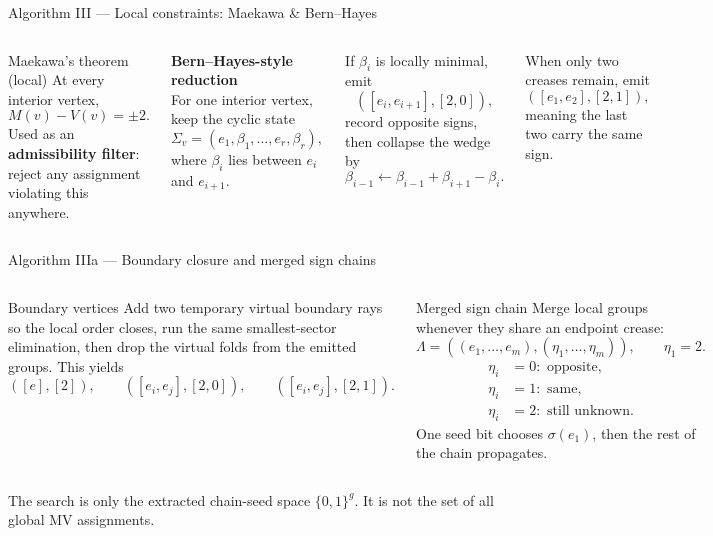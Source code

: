 \documentclass[aspectratio=169,10pt]{beamer}
\begin{document}
\begin{frame}{Algorithm III — Local constraints: Maekawa \& Bern--Hayes}
\begin{columns}[T,onlytextwidth]
\begin{block}{Maekawa's theorem (local) \cite{hull_math_flat}}
At every interior vertex,
\[
M(v)-V(v)=\pm 2.
\]
Used as an \textbf{admissibility filter}: reject any assignment violating
this anywhere.
\end{block}

\textbf{Bern--Hayes-style reduction \cite{bern_hayes}}\\[4pt]
\scriptsize For one interior vertex, keep the cyclic state
\[
\Sigma_v=(e_1,\beta_1,\dots,e_r,\beta_r),
\]
where \(\beta_i\) lies between \(e_i\) and \(e_{i+1}\).

\smallskip
\scriptsize If \(\beta_i\) is locally minimal, emit
\[
([e_i,e_{i+1}],[2,0]),
\]
\scriptsize record opposite signs, then collapse the wedge by
\[
\beta_{i-1}\leftarrow \beta_{i-1}+\beta_{i+1}-\beta_i.
\]

\smallskip
\scriptsize When only two creases remain, emit
\[
([e_1,e_2],[2,1]),
\]
meaning the last two carry the same sign.
\end{columns}
\end{frame}

\begin{frame}{Algorithm IIIa — Boundary closure and merged sign chains}
\begin{columns}[T,onlytextwidth]
\begin{block}{Boundary vertices}
\footnotesize Add two temporary virtual boundary rays so the local order
closes, run the same smallest-sector elimination, then drop the virtual folds
from the emitted groups. This yields
\[
([e],[2]),\qquad ([e_i,e_j],[2,0]),\qquad ([e_i,e_j],[2,1]).
\]
\end{block}

\begin{alertblock}{Merged sign chain}
\footnotesize Merge local groups whenever they share an endpoint crease:
\[
\Lambda=((e_1,\dots,e_m),(\eta_1,\dots,\eta_m)),
\qquad
\eta_1=2.
\]
\[
\begin{aligned}
\eta_i&=0:\text{ opposite},\\
\eta_i&=1:\text{ same},\\
\eta_i&=2:\text{ still unknown}.
\end{aligned}
\]
One seed bit chooses \(\sigma(e_1)\), then the rest of the chain propagates.
\end{alertblock}
\end{columns}

\smallskip
\footnotesize The search is only the extracted chain-seed space \(\{0,1\}^g\).
It is not the set of all global MV assignments.
\end{frame}
\end{document}

